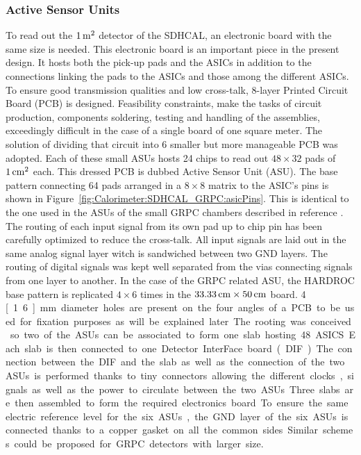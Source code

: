\subsubsection{Active Sensor Units}

To read out the $\unit[1]{m^2}$ detector of the SDHCAL, an electronic board with the
same size is needed. This electronic board is an important piece in the present
design. It hosts both the pick-up pads and the ASICs in addition to the
connections linking the pads to the ASICs and those among the different ASICs.
To ensure good transmission qualities and low cross-talk, 8-layer Printed
Circuit Board (PCB) is designed. Feasibility constraints, make the tasks of
circuit production, components soldering, testing and handling of the
assemblies, exceedingly difficult in the case of a single board of one square
meter. The solution of dividing that circuit into 6 smaller but more
manageable PCB was adopted. Each of these small ASUs hosts 24 chips to read out
$48\times 32$ pads of $\unit[1]{cm^2}$ each. This dressed PCB is dubbed Active Sensor
Unit (ASU). The base pattern connecting 64 pads arranged in a $8\times 8$ matrix
to the ASIC's pins is shown in Figure~\ref{fig:Calorimeter:SDHCAL_GRPC:asicPins}. This is identical to the
one used in the ASUs of the small GRPC chambers described in reference
\cite{1748-0221-6-02-P02001}. The routing of each input signal from its own pad up to chip pin
has been carefully optimized to reduce the cross-talk. All input signals are
laid out in the same analog signal layer witch is sandwiched between two GND
layers. The routing of digital signals was kept well separated from the vias
connecting signals from one layer to another. In the case of the GRPC related
ASU, the HARDROC base pattern is replicated $4\times 6$ times in the $\unit[33.33]{cm}
\times \unit[50]{cm}$ board. 4 \unit[1.6]{mm} diameter holes are present on the four
angles of a PCB to be used for fixation purposes as will be explained later.
The rooting was conceived so two of the ASUs can be associated to form one slab
hosting 48 ASICS. Each slab is then connected to one Detector InterFace board
(DIF). The connection between the DIF and the slab as well as the connection
of the two ASUs is performed thanks to tiny connectors allowing the
different clocks, signals as well as the power to circulate between the two
ASUs. Three slabs are then assembled to form the required electronics board.
To ensure the same electric reference level for the six ASUs, the GND layer of
the six ASUs is connected thanks to a copper gasket on all the common sides.
Similar schemes could be proposed for GRPC detectors with larger size.


